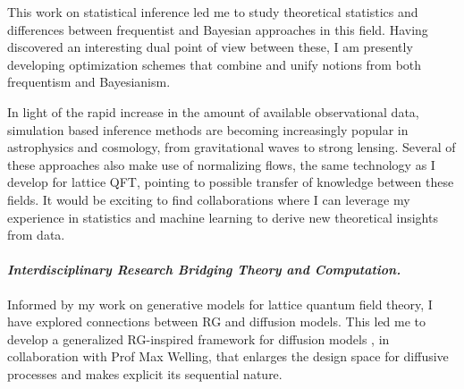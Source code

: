 \documentclass[11pt]{article}
\begin{document}
This work on statistical inference led me to study theoretical statistics and differences between frequentist and Bayesian approaches in this field.
Having discovered an interesting dual point of view between these, I am presently developing optimization schemes that combine and unify notions from both frequentism and Bayesianism.

\textbf{\color{royalblue}{Future Directions.}}
In light of the rapid increase in the amount of available observational data, simulation based inference methods are becoming increasingly popular in astrophysics and cosmology, from gravitational waves to strong lensing.
Several of these approaches also make use of normalizing flows, the same technology as I develop for lattice QFT, pointing to possible transfer of knowledge between these fields.
It would be exciting to find collaborations where I can leverage my experience in statistics and machine learning to derive new theoretical insights from data.

\paragraph{\textit{{Interdisciplinary Research Bridging Theory and Computation.}}}
Informed by my work on generative models for lattice quantum field theory, I have explored connections between RG and diffusion models.
This led me to develop a generalized RG-inspired framework for diffusion models \cite{gerdes2024gudgenerationunifieddiffusion}, in collaboration with Prof Max Welling, that enlarges the design space for diffusive processes and makes explicit its sequential nature.



{
    \small
    
}
\end{document}
